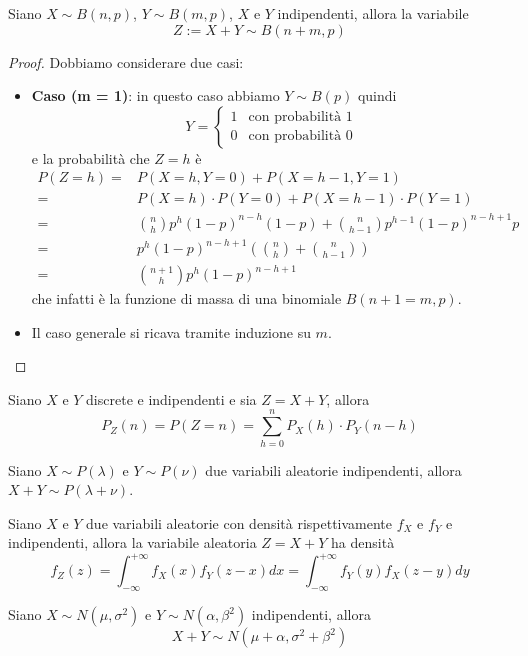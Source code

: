 \begin{proposition}
	Siano $X \sim B(n, p)$, $Y \sim B(m, p)$, $X$ e $Y$ indipendenti, allora la variabile
	\[ Z := X + Y \sim B(n + m, p) \]
	\begin{proof}
		Dobbiamo considerare due casi:
		\begin{itemize}
			\item \textbf{Caso (m = 1)}: in questo caso abbiamo $Y \sim B(p)$ quindi
			      \[
				      Y = \begin{cases}
					      1 & \text{con probabilità } 1 \\
					      0 & \text{con probabilità } 0
				      \end{cases}
			      \]
			      e la probabilità che $Z = h$ è
			      \begin{align*}
				      P(Z = h) = & P(X = h, Y = 0) + P(X = h-1, Y = 1)                          \\
				      =          & P(X = h) \cdot P(Y = 0) + P(X = h-1) \cdot P(Y = 1)          \\
				      =          & \binom{n}{h} p^h (1-p)^{n-h} (1-p) +
				      \binom{n}{h-1} p^{h-1} (1-p)^{n-h+1} p                                    \\
				      =          & p^h (1-p)^{n-h+1} \left(\binom{n}{h} + \binom{n}{h-1}\right) \\
				      =          & \binom{n+1}{h} p^h (1-p)^{n-h+1}
			      \end{align*}
			      che infatti è la funzione di massa di una binomiale $B(n+1 = m, p)$.
			\item Il caso generale si ricava tramite induzione su $m$.
		\end{itemize}
	\end{proof}
\end{proposition}

\begin{proposition}
	Siano $X$ e $Y$ discrete e indipendenti e sia $Z = X + Y$, allora
	\[ P_Z(n) = P(Z = n) = \sum_{h=0}^n P_X(h) \cdot P_Y(n-h) \]
\end{proposition}

\begin{proposition}
	Siano $X \sim P(\lambda)$ e $Y \sim P(\nu)$ due variabili aleatorie indipendenti, allora
	$X+Y \sim P(\lambda + \nu)$.
\end{proposition}

\begin{proposition}[Convoluzione]
	Siano $X$ e $Y$ due variabili aleatorie con densità rispettivamente $f_X$ e $f_Y$ e
	indipendenti, allora la variabile aleatoria $Z = X + Y$ ha densità
	\[
		f_Z (z) = \int_{-\infty}^{+\infty} f_X (x) f_Y (z - x) dx =
		\int_{-\infty}^{+\infty} f_Y (y) f_X (z - y) dy
	\]
\end{proposition}

\begin{proposition}
	Siano $X \sim N(\mu, \sigma^2)$ e $Y \sim N(\alpha, \beta^2)$ indipendenti, allora
	\[ X + Y \sim N(\mu + \alpha, \sigma^2 + \beta^2) \]
\end{proposition}